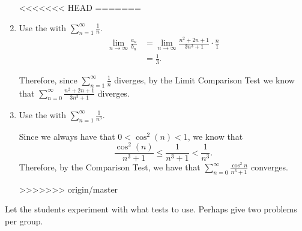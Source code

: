 \documentclass[handout]{ximera}
\begin{document}
\begin{problem}
\begin{freeResponse}
\begin{enumerate}
<<<<<<< HEAD
=======
			
			\item  Use the  with $\sum_{n=1}^\infty \frac{1}{n}$.
			\begin{align*}
			\lim_{n \to \infty} \frac{a_n}{b_n}
			&= \lim_{n \to \infty} \frac{n^2+2n+1}{3n^3+1} \cdot \frac{n}{1}  \\
			&= \frac{1}{3}.
			\end{align*}
			
		Therefore, since $\sum_{n=1}^\infty \frac{1}{n}$ diverges, by the Limit Comparison Test we know that $\sum_{n=0}^\infty \frac{n^2+2n+1}{3n^3+1}$ diverges.
		
		\item  Use the  with $\sum_{n=1}^\infty \frac{1}{n^3}$.  
		
		Since we always have that $0 < \cos^2(n) < 1$, we know that
			\[
			\frac{\cos^2(n)}{n^3 + 1} \leq \frac{1}{n^3+1} < \frac{1}{n^3}.
			\]
		Therefore, by the Comparison Test, we have that $\sum_{n=0}^\infty \frac{\cos^2 n}{n^3+1}$ converges.
		
	
		
		
>>>>>>> origin/master
		\end{enumerate}
	\end{freeResponse}
	
\end{problem}

\begin{instructorNotes}
Let the students experiment with what tests to use.  
Perhaps give two problems per group.
\end{instructorNotes}
\end{document}
